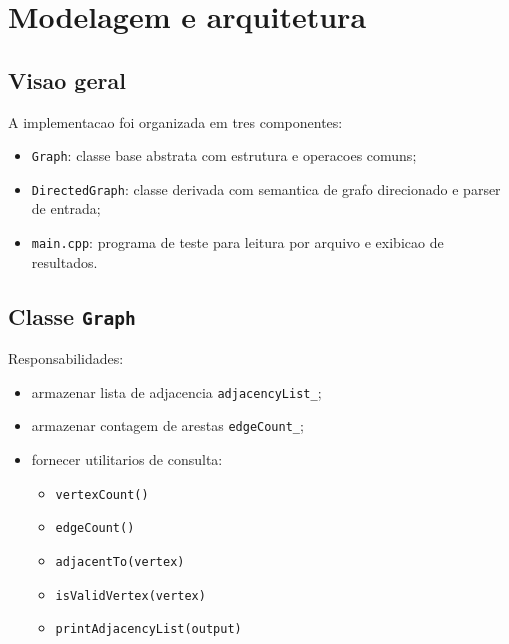 \documentclass[12pt,a4paper]{article}
\begin{document}
\section{Modelagem e arquitetura}
\subsection{Visao geral}
A implementacao foi organizada em tres componentes:
\begin{itemize}
    \item \texttt{Graph}: classe base abstrata com estrutura e operacoes comuns;
    \item \texttt{DirectedGraph}: classe derivada com semantica de grafo direcionado e parser de entrada;
    \item \texttt{main.cpp}: programa de teste para leitura por arquivo e exibicao de resultados.
\end{itemize}

\subsection{Classe \texttt{Graph}}
Responsabilidades:
\begin{itemize}
    \item armazenar lista de adjacencia \texttt{adjacencyList\_};
    \item armazenar contagem de arestas \texttt{edgeCount\_};
    \item fornecer utilitarios de consulta:
    \begin{itemize}
        \item \texttt{vertexCount()}
        \item \texttt{edgeCount()}
        \item \texttt{adjacentTo(vertex)}
        \item \texttt{isValidVertex(vertex)}
        \item \texttt{printAdjacencyList(output)}
    \end{itemize}
\end{itemize}
\end{document}
